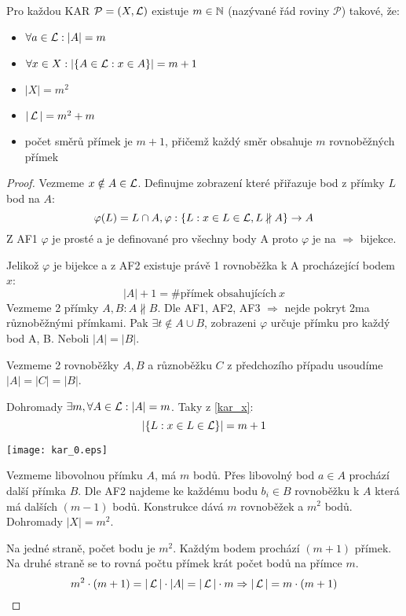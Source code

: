 \begin{theorem}
    Pro každou KAR $\mathcal{P}=(X,\operatorname{\mathcal{L}})$ existuje $m\in\operatorname{\mathbb{N}}$ (nazývané řád roviny $\mathcal{P}$) takové, že:
    \begin{itemize}
        \item $\forall a\in\operatorname{\mathcal{L}}: |A| = m$
        \item $\forall x\in X: |\{A\in\operatorname{\mathcal{L}}: x\in A\}|=m+1$
        \item $|X|=m^2$
        \item $|\operatorname{\mathcal{L}}| = m^2+m$
        \item počet směrů přímek je $m+1$, přičemž každý směr obsahuje $m$ rovnoběžných přímek
    \end{itemize}
\end{theorem}
\begin{proof}
	Vezmeme $x \notin A \in \operatorname{\mathcal{L}}$.
	Definujme zobrazení které přiřazuje bod z přímky $L$ bod na $A$:
	\[ \varphi(L) = L \cap A, \varphi:\{ L: x \in L \in \operatorname{\mathcal{L}}, L \nparallel A \} \to A \]
	Z AF1 $\varphi$ je prosté a je definované pro všechny body A proto $\varphi$ je na $\Rightarrow$ bijekce.

	Jelikož $\varphi$ je bijekce a z AF2 existuje právě 1 rovnoběžka k A procházející bodem $x$:
	\begin{equation}\label{kar_x}
		|A| + 1 = \text{\# přímek obsahujících}\ x
	\end{equation}
	Vezmeme 2 přímky $A, B: A \nparallel B$. Dle AF1, AF2, AF3 $\Rightarrow$ nejde pokryt 2ma různoběžnými přímkami.
	Pak $\exists t \notin A \cup B$, zobrazeni $\varphi$ určuje přímku pro každý bod A, B.
	Neboli $|A| = |B|$.

	Vezmeme 2 rovnoběžky $A, B$ a různoběžku $C$ z předchozího případu usoudíme $|A| = |C| = |B|$.

	Dohromady $\exists m, \forall A \in \operatorname{\mathcal{L}}: |A| = m$.
	Taky z \eqref{kar_x}:
	\[ | \{L : x \in L \in \operatorname{\mathcal{L}}\} | = m + 1 \]

	\texttt{[image: kar\_0.eps]}

	Vezmeme libovolnou přímku $A$, má $m$ bodů. Přes libovolný bod $a \in A$ prochází další přímka $B$.
	Dle AF2 najdeme ke každému bodu $b_i \in B$ rovnoběžku k $A$ která má dalších $(m - 1)$ bodů.
	Konstrukce dává $m$ rovnoběžek a $m^2$ bodů.
	Dohromady $|X| = m^2$.

	Na jedné straně, počet bodu je $m^2$. Každým bodem prochází $(m + 1)$ přímek.
	Na druhé straně se to rovná počtu přímek krát počet bodů na přímce $m$.
	\[ m^2 \cdot (m + 1) = |\operatorname{\mathcal{L}}| \cdot |A| = |\operatorname{\mathcal{L}}| \cdot m \Rightarrow |\operatorname{\mathcal{L}}| = m \cdot (m + 1) \]

\end{proof}
